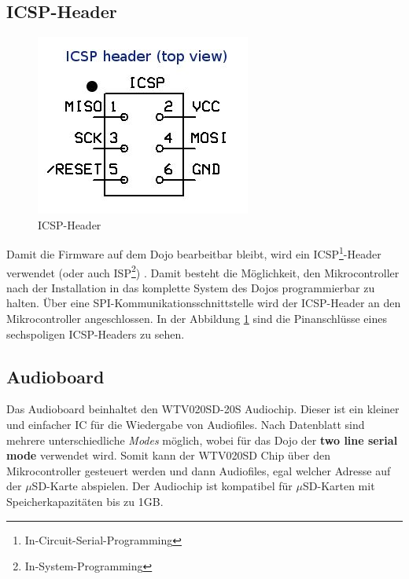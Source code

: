 \subsection{ICSP-Header}
\begin{figure}
	\vspace{-40pt}
  	\begin{center}
		\includegraphics[scale=0.6]{Bilder/icsp_header.png}
  	\end{center}
 	\vspace{-20pt}	
	\caption{ICSP-Header}
  	\vspace{-2cm}
	\label{fig:icsp_header_topview}
\end{figure}
Damit die Firmware auf dem Dojo bearbeitbar bleibt, wird ein ICSP\footnote{In-Circuit-Serial-Programming}-Header verwendet (oder auch ISP\footnote{In-System-Programming}) \cite{ispwiki}. Damit besteht die Möglichkeit, den Mikrocontroller nach der Installation in das komplette System des Dojos programmierbar zu halten. Über eine SPI-Kommunikationsschnittstelle wird der ICSP-Header an den Mikrocontroller angeschlossen. In der Abbildung \ref{fig:icsp_header_topview} sind die Pinanschlüsse eines sechspoligen ICSP-Headers zu sehen.\\
\vspace{1cm}
\subsection{Audioboard}
Das Audioboard beinhaltet den WTV020SD-20S Audiochip. Dieser ist ein kleiner und einfacher IC für die Wiedergabe von Audiofiles. Nach Datenblatt sind mehrere unterschiedliche \textit{Modes} möglich, wobei für das Dojo der \textbf{two line serial mode} verwendet wird. Somit kann der WTV020SD Chip über den Mikrocontroller gesteuert werden und dann Audiofiles, egal welcher Adresse auf der $\mu$SD-Karte abspielen. Der Audiochip ist kompatibel für $\mu$SD-Karten mit Speicherkapazitäten bis zu 1GB. 
\newpage
